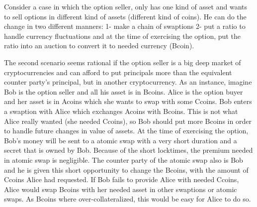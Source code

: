 Consider a case in which the option seller, only has one kind of asset and wants to sell options in different kind of assets (different kind of coins). He can do the change in two different manners: 1- make a chain of swaptions 2- put a ratio to handle currency fluctuations and at the time of exercising the option, put the ratio into an auction to convert it to needed currency (Bcoin).

The second scenario seems rational if the option seller is a big deep market of cryptocurrencies and can afford to put principals more than the equivalent counter party's principal, but in another cryptocurrency.
As an instance, imagine Bob is the option seller and all his asset is in Bcoins. Alice is the option buyer and her asset is in Acoins which she wants to swap with some Ccoins. Bob enters a swaption with Alice which exchanges Acoins with Bcoins. This is not what Alice really wanted (she needed Ccoins), so Bob should put more Bcoins in order to handle future changes in value of assets. At the time of exercising the option, Bob's money will be sent to a atomic swap with a very short duration and a secret that is owned by Bob. Because of the short locktimes, the premium needed in atomic swap is negligible. The counter party of the atomic swap also is Bob and he is given this short opportunity to change the Bcoins, with the amount of Ccoins Alice had requested. If Bob fails to provide Alice with needed Ccoins, Alice would swap Bcoins with her needed asset in other swaptions or atomic swaps. As Bcoins where over-collateralized, this would be easy for Alice to do so.